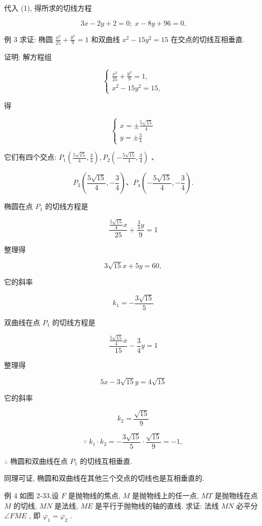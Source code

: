 \documentclass[lang=cn,newtx,10pt,scheme=chinese]{elegantbook}
\begin{document}
代入 (1), 得所求的切线方程

\[
    {3x} - {2y} + 2 = 0;\;x - {8y} + {96} = 0.
\]

例 3 求证: 椭圆 \(\frac{{x}^{2}}{25} + \frac{{y}^{2}}{9} = 1\) 和双曲线 \({x}^{2} - {15}{y}^{2} = {15}\) 在交点的切线互相垂直.

证明: 解方程组

\[
  \left\{ \begin{array}{l} \frac{{x}^{2}}{25} + \frac{{y}^{2}}{9} = 1, \\ {x}^{2} - {15}{y}^{2} = {15}, \end{array}\right.
\]

得

\[
  \left\{ \begin{array}{l} x = \pm \frac{5\sqrt{15}}{4} \\ y = \pm \frac{3}{4} \end{array}\right.
\]

它们有四个交点: \({P}_{1}\left( {\frac{5\sqrt{15}}{4},\frac{3}{4}}\right) ,{P}_{2}\left( {-\frac{5\sqrt{15}}{4},\frac{3}{4}}\right)\) 、

\[
    {P}_{3}\left( {\frac{5\sqrt{15}}{4}, - \frac{3}{4}}\right) \text{、}{P}_{4}\left( {-\frac{5\sqrt{15}}{4}, - \frac{3}{4}}\right) .
\]

椭圆在点 \({P}_{1}\) 的切线方程是

\[
  \frac{\frac{5\sqrt{15}}{4}x}{25} + \frac{\frac{3}{4}y}{9} = 1
\]

整理得

\[
  3\sqrt{15}x + {5y} = {60},
\]

它的斜率

\[
    {k}_{1} = - \frac{3\sqrt{15}}{5}
\]

双曲线在点 \({P}_{1}\) 的切线方程是

\[
  \frac{\frac{5\sqrt{15}}{4}x}{15} - \frac{3}{4}y = 1
\]

整理得

\[
    {5x} - 3\sqrt{15}y = 4\sqrt{15}
\]

它的斜率

\[
    {k}_{2} = \frac{\sqrt{15}}{9}
\]

\[
  \because \;{k}_{1} \cdot {k}_{2} = - \frac{3\sqrt{15}}{5} \cdot \frac{\sqrt{15}}{9} = - 1,
\]

\(\therefore\) 椭圆和双曲线在点 \({P}_{1}\) 的切线互相垂直.

同理可证, 椭圆和双曲线在其他三个交点的切线也是互相垂直的.

例 4 如图 2-33,设 \(F\) 是抛物线的焦点, \(M\) 是抛物线上的任一点, \({MT}\) 是抛物线在点 \(M\) 的切线, \({MN}\) 是法线, \({ME}\) 是平行于抛物线的轴的直线. 求证: 法线 \({MN}\) 必平分 \(\angle {FME}\) , 即 \({\varphi }_{1} = {\varphi }_{2}\) .
\end{document}
